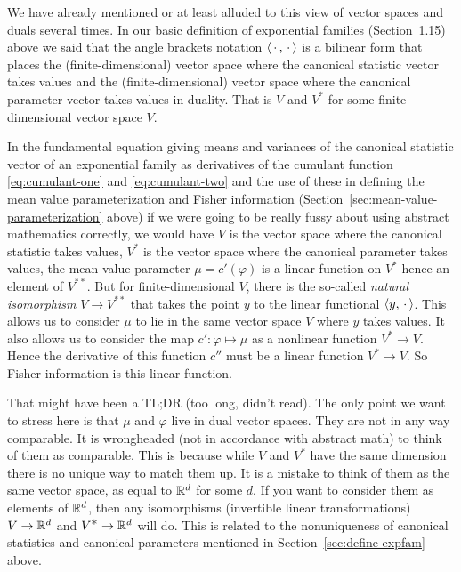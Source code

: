 We have already mentioned or at least alluded to this view of vector spaces
and duals several times.  In our basic definition of exponential families
(Section~1.15) above we said that the angle brackets notation
$\langle \,\cdot\,, \,\cdot\, \rangle$ is a bilinear form that places the
(finite-dimensional) vector space where the canonical statistic vector
takes values and the
(finite-dimensional) vector space where the canonical parameter vector
takes values in duality.  That is $V$ and $V^{\textstyle *}$ for some
finite-dimensional vector space $V$.

In the fundamental equation giving means and variances of the canonical
statistic vector of an exponential family as derivatives of the cumulant
function \eqref{eq:cumulant-one} and \eqref{eq:cumulant-two} and the use
of these in defining the mean value parameterization and Fisher information
(Section~\ref{sec:mean-value-parameterization} above) if we were going to
be really fussy about using abstract mathematics correctly, we would have
$V$ is the vector space where the canonical statistic takes values,
$V^{\textstyle *}$ is the vector space where the canonical parameter
takes values,
the mean value parameter $\mu = c'(\varphi)$ is a linear function on
$V^{\textstyle *}$ hence an element of $V^{\textstyle {*}{*}}$.
But for finite-dimensional $V$, there is the so-called
\emph{natural isomorphism} $V \to V^{\textstyle {*}{*}}$ that takes the
point $y$ to the linear functional $\langle y, \,\cdot\, \rangle$.
This allows us to consider $\mu$ to lie in the same vector space $V$
where $y$ takes values.  It also allows us to consider the map
$c' : \varphi \mapsto \mu$ as a nonlinear function $V^{\textstyle *} \to V$.
Hence the derivative of this function $c''$ must be a linear function
$V^{\textstyle *} \to V$.  So Fisher information is this linear function.

That might have been a TL;DR (too long, didn't read).  The only point we
want to stress here is that $\mu$ and $\varphi$ live in dual vector spaces.
They are not in any way comparable.  It is wrongheaded (not in accordance
with abstract math) to think of them as comparable.  This is because
while $V$ and $V^{\textstyle *}$ have the same dimension
\citep[if finite-dimensional][Theorem~2 of Section~15]{halmos-vector-spaces}
there is no unique way to match them up.  It is a mistake to think of them
as the same vector space, as equal to $\mathbb{R}^d$ for some $d$.
If you want to consider them as elements of $\mathbb{R}^d$, then any isomorphisms
(invertible linear transformations) $V \to \mathbb{R}^d$
and $V^{\textstyle *} \to \mathbb{R}^d$ will do.  This is related to the
nonuniqueness of canonical statistics and canonical parameters mentioned
in Section~\ref{sec:define-expfam} above.

